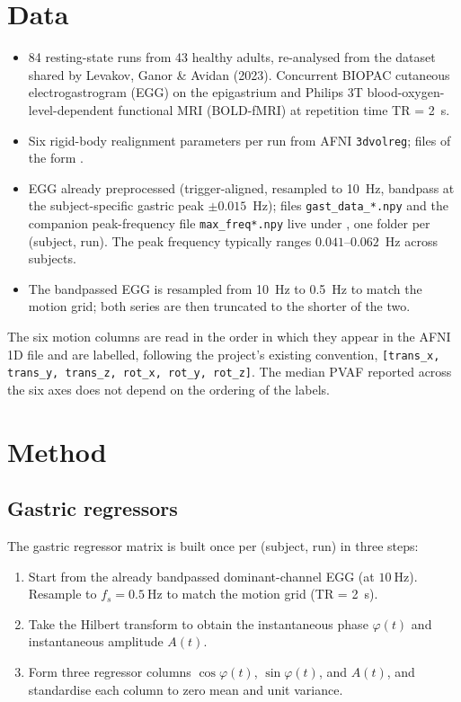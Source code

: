\documentclass[11pt]{article}
\begin{document}
\clearpage

\section{Data}

\begin{itemize}
\item 84 resting-state runs from 43 healthy adults, re-analysed from the
dataset shared by Levakov, Ganor \& Avidan (2023). Concurrent BIOPAC
cutaneous electrogastrogram (EGG) on the epigastrium and Philips 3T
blood-oxygen-level-dependent functional MRI (BOLD-fMRI) at repetition
time TR = \SI{2}{\second}.
\item Six rigid-body realignment parameters per run from AFNI
\verb|3dvolreg|; files of the form
.
\item EGG already preprocessed (trigger-aligned, resampled to
\SI{10}{\hertz}, bandpass at the subject-specific gastric peak
$\pm 0.015$~Hz); files \texttt{gast\_data\_*.npy} and the companion
peak-frequency file \texttt{max\_freq*.npy} live under
, one folder per (subject, run). The peak
frequency typically ranges $0.041$--$0.062$~Hz across subjects.
\item The bandpassed EGG is resampled from \SI{10}{\hertz} to
\SI{0.5}{\hertz} to match the motion grid; both series are then
truncated to the shorter of the two.
\end{itemize}

The six motion columns are read in the order in which they appear in
the AFNI 1D file and are labelled, following the project's existing
convention,
\texttt{[trans\_x, trans\_y, trans\_z, rot\_x, rot\_y, rot\_z]}. The
median PVAF reported across the six axes does not depend on the
ordering of the labels.

\section{Method}

\subsection{Gastric regressors}

The gastric regressor matrix is built once per (subject, run) in three
steps:
\begin{enumerate}
\item Start from the already bandpassed dominant-channel EGG (at
$\SI{10}{\hertz}$). Resample to $f_s = \SI{0.5}{\hertz}$ to match the
motion grid (TR = 2~s).
\item Take the Hilbert transform to obtain the instantaneous phase
$\varphi(t)$ and instantaneous amplitude $A(t)$.
\item Form three regressor columns $\cos\varphi(t)$, $\sin\varphi(t)$,
and $A(t)$, and standardise each column to zero mean and unit variance.
\end{enumerate}
\end{document}
